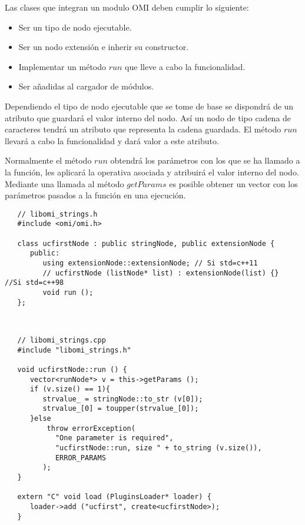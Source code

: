 Las clases que integran un modulo OMI deben cumplir lo siguiente:

\begin{itemize}
\item Ser un tipo de nodo ejecutable. 
\item Ser un nodo extensión e inherir su constructor.
\item Implementar un método $run$ que lleve a cabo la funcionalidad.
\item Ser añadidas al cargador de módulos.
\end{itemize}

Dependiendo el tipo de nodo ejecutable que se tome de base se dispondrá 
de un atributo que guardará el valor interno del nodo. Así un nodo de tipo cadena
de caracteres tendrá un atributo que representa la cadena guardada. El método 
$run$ llevará a cabo la funcionalidad y dará valor a este atributo.

Normalmente el método $run$ obtendrá los parámetros con los que se ha llamado a la 
función, les aplicará la operativa asociada y atribuirá el valor interno del 
nodo. Mediante una llamada al método $getParams$ es posible obtener un vector
con los parámetros pasados a la función en una ejecución. \\

  

\lstset{language=cpp} 
\begin{lstlisting} 
   // libomi_strings.h
   #include <omi/omi.h>

   class ucfirstNode : public stringNode, public extensionNode {
      public:
         using extensionNode::extensionNode; // Si std=c++11
         // ucfirstNode (listNode* list) : extensionNode(list) {}  //Si std=c++98
         void run ();
   };
\end{lstlisting}
\hfill\\ 

\begin{lstlisting}
   // libomi_strings.cpp
   #include "libomi_strings.h"
   
   void ucfirstNode::run () { 
      vector<runNode*> v = this->getParams ();
      if (v.size() == 1){
         strvalue_ = stringNode::to_str (v[0]);
         strvalue_[0] = toupper(strvalue_[0]);
      }else
          throw errorException(
            "One parameter is required", 
            "ucfirstNode::run, size " + to_string (v.size()), 
            ERROR_PARAMS
         );
   }  
   
   extern "C" void load (PluginsLoader* loader) {
      loader->add ("ucfirst", create<ucfirstNode>);
   }
\end{lstlisting}
\hfill\\ 

